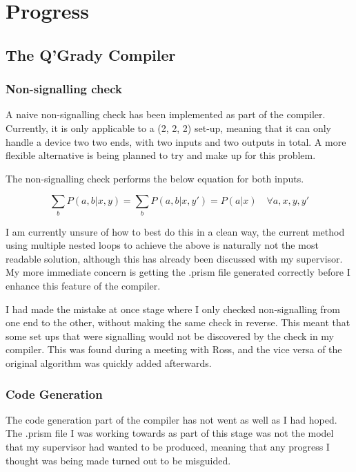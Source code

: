 \documentclass[report.tex]{subfiles}
\begin{document}
\section{Progress} %
\label{cha:progress}

\subsection{The Q'Grady Compiler} %
\label{sub:the_q_grady_compiler}
\subsubsection{Non-signalling check} %
\label{sub:non_signalling_check}
A naive non-signalling check has been implemented as part of the compiler.
Currently, it is only applicable to a (2, 2, 2) set-up, meaning that it can only
handle a device two two ends, with two inputs and two outputs in total. A more
flexible alternative is being planned to try and make up for this problem.

The non-signalling check performs the below equation for both inputs. 

\[\sum_{b} P(a, b | x, y) = \sum_{b} P(a, b | x, y') = P(a | x) 
\quad \forall a, x, y, y'\]

I am currently unsure of how to best do this in a clean way, the current method
using multiple nested loops to achieve the above is naturally not the most
readable solution, although this has already been discussed with my supervisor.
My more immediate concern is getting the .prism file generated correctly before
I enhance this feature of the compiler.

I had made the mistake at once stage where I only checked non-signalling from
one end to the other, without making the same check in reverse. This meant that
some set ups that were signalling would not be discovered by the check in my
compiler. This was found during a meeting with Ross, and the vice versa of the
original algorithm was quickly added afterwards.

\subsubsection{Code Generation} %
\label{ssub:code_generation}
The code generation part of the compiler has not went as well as I had hoped.
The .prism file I was working towards as part of this stage was not the model
that my supervisor had wanted to be produced, meaning that any progress I
thought was being made turned out to be misguided.
\end{document}
